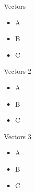 \begin{frame}{Vectors}
    \begin{itemize}
        \item A
        \item B
        \item C
    \end{itemize}
\end{frame}

\begin{frame}{Vectors 2}
    \begin{itemize}
        \item A
        \item B
        \item C
    \end{itemize}
\end{frame}

\begin{frame}{Vectors 3}
    \begin{itemize}
        \item A
        \item B
        \item C
    \end{itemize}
\end{frame}